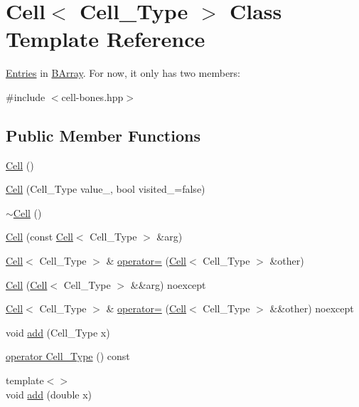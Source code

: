 \hypertarget{class_cell}{}\section{Cell$<$ Cell\+\_\+\+Type $>$ Class Template Reference}
\label{class_cell}


\hyperlink{class_entries}{Entries} in \hyperlink{class_b_array}{B\+Array}. For now, it only has two members\+:  




{\ttfamily \#include $<$cell-\/bones.\+hpp$>$}

\subsection*{Public Member Functions}
\begin{DoxyCompactItemize}
\item 
\hyperlink{class_cell_a402912c21a4c87659c0576a4bfa3c48f}{Cell} ()
\item 
\hyperlink{class_cell_a6592b5fcfc80001c8de64a2e722ca715}{Cell} (Cell\+\_\+\+Type value\+\_\+, bool visited\+\_\+=false)
\item 
\hyperlink{class_cell_a12667d768c7eab9e295b3476a5d60c0e}{$\sim$\+Cell} ()
\item 
\hyperlink{class_cell_a667a3060f565f033a62038500e81342d}{Cell} (const \hyperlink{class_cell}{Cell}$<$ Cell\+\_\+\+Type $>$ \&arg)
\item 
\hyperlink{class_cell}{Cell}$<$ Cell\+\_\+\+Type $>$ \& \hyperlink{class_cell_a6cfdc588dba9ca10a11693d644ac0c60}{operator=} (\hyperlink{class_cell}{Cell}$<$ Cell\+\_\+\+Type $>$ \&other)
\item 
\hyperlink{class_cell_ad6a47fdac801426e94328239890394fe}{Cell} (\hyperlink{class_cell}{Cell}$<$ Cell\+\_\+\+Type $>$ \&\&arg) noexcept
\item 
\hyperlink{class_cell}{Cell}$<$ Cell\+\_\+\+Type $>$ \& \hyperlink{class_cell_a9ea03f80e1b160ca43b1db5b5792e482}{operator=} (\hyperlink{class_cell}{Cell}$<$ Cell\+\_\+\+Type $>$ \&\&other) noexcept
\item 
void \hyperlink{class_cell_a3d063afd2a8743623d0e524debbd55e9}{add} (Cell\+\_\+\+Type x)
\item 
\hyperlink{class_cell_abe9b289bc80d4f5d0717ba9e69197c0b}{operator Cell\+\_\+\+Type} () const
\item 
{\footnotesize template$<$$>$ }\\void \hyperlink{class_cell_a64d4b92f322ccb8cfbad53f816d2caf8}{add} (double x)

\end{DoxyCompactItemize}
